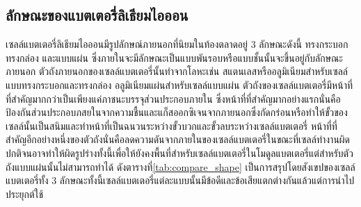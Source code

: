 \subsection{ลักษณะของแบตเตอรี่ลิเธียมไอออน}
เซลล์แบตเตอรี่ลิเธียมไอออนมีรูปลักษณ์ภายนอกที่นิยมในท้องตลาดอยู่ 3 ลักษณะดังนี้ ทรงกระบอก ทรงกล่อง และแบบแผ่น ซึ่งภายในจะมีลักษณะเป็นแบบพันรอบหรือแบบชั้นนั้นจะขึ้นอยู่กับลักษณะภายนอก\newline
ตัวถังภายนอกของเซลล์แบตเตอรี่นั้นทำจากโลหะเช่น สแตนเลสหรืออลูมิเนียมสำหรับเซลล์แบบทรงกระบอกและทรงกล่อง อลูมิเนียมแผ่นสำหรับเซลล์แบบแผ่น ตัวถังของเซลล์แบตเตอรี่มีหน้าที่ที่สำคัญมากกว่าเป็นเพียงแค่ภาชนะบรรจุส่วนประกอบภายใน ซึ่งหน้าที่ที่สำคัญมากอย่างแรกนั่นคือป้องกันส่วนประกอบภสยในจากความชื้นและแก็สออกซิเจนจากภายนอกซึ่งกัดกร่อนหรือทำให้ขั้วของเซลล์นั้นเป็นสนิมและทำหน้าที่เป็นฉนวนระหว่างขั้วบวกและขั้วลบระหว่างเซลล์แบตเตอรี่ หน้าที่ที่สำคัญอีกอย่างหนึ่งของตัวถังนั่นคือลดความดันจากภายในของเซลล์แบตเตอรี่ในขณะที่เซลล์ทำงานผิดปกติจนอาจทำให้ผิดรูปร่างทั้งนี้เพื่อให้ยังคงพื้นที่สำหรับเซลล์แบตเตอรี่ในโมดูลแบตเตอรี่แต่สำหรับตัวถังแบบแผ่นนั้นไม่สามารถทำได้\newline
ดังตารางที่\ref{tab:compare_shape} เป็นการสรุปโดยสังเขปของเซลล์แบตเตอรี่ทั้ง 3 ลักษณะทั้งนี้เซลล์แบตเตอรี่แต่ละแบบนั้นมีข้อดีและข้อเสียแตกต่างกันแล้วแต่การนำไปประยุกต์ใช้

